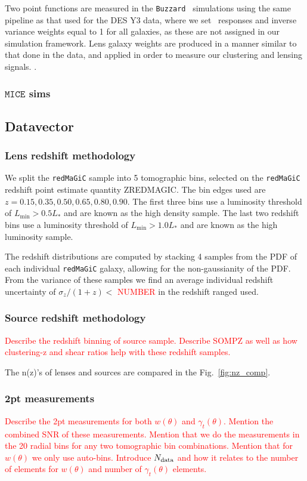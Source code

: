 \documentclass[fleqn,usenatbib]{mnras}
\newcommand{\gammat}{\ensuremath{\gamma_{t}(\theta)}}
\newcommand{\wtheta}{\ensuremath{w(\theta)}}
\newcommand{\redmagic}{\texttt{redMaGiC} }
\newcommand{\mice}{\texttt{MICE} }
\newcommand{\buzzard}{\texttt{Buzzard} }
\newcommand{\red}[1]{\textcolor{red}{#1}}
\begin{document}
Two point functions are measured in the \buzzard\ simulations using the same pipeline as that used for the DES Y3 data, where we set \metacal\ responses and inverse variance weights equal to 1 for all galaxies, as these are not assigned in our simulation framework. Lens galaxy weights are produced in a manner similar to that done in the data, and applied in order to measure our clustering and lensing signals. .

\subsubsection{$\mice$ sims}

\subsection{Datavector}

\subsubsection{Lens redshift methodology}
We split the \redmagic sample into 5 tomographic bins, selected on the \redmagic redshift point estimate quantity ZREDMAGIC. The bin edges used are $z=0.15, 0.35, 0.50, 0.65, 0.80, 0.90$. The first three bins use a luminosity threshold of $L_{\min} > 0.5 L_{*}$ and are known as the high density sample. The last two redshift bins use a luminosity threshold of $L_{\min} > 1.0 L_{*}$ and are known as the high luminosity sample.

The redshift distributions are computed by stacking 4 samples from the PDF of each individual \redmagic galaxy, allowing for the non-gaussianity of the PDF. From the variance of these samples we find an average individual redshift uncertainty of $\sigma_z/(1+z) < $ \red{NUMBER} in the redshift ranged used.

\subsubsection{Source redshift methodology}
\red{Describe the redshift binning of source sample. Describe SOMPZ as well as how clustering-z and shear ratios help with these redshift samples.}

The n(z)'s of lenses and sources are compared in the Fig.~\ref{fig:nz_comp}.


\subsubsection{2pt measurements}
\red{Describe the 2pt measurements for both $\wtheta$ and $\gammat$. Mention the combined SNR of these measurements. Mention that we do the measurements in the 20 radial bins for any two tomographic bin combinations. Mention that for $\wtheta$ we only use auto-bins. Introduce $N_{\rm data}$ and how it relates to the number of elements for $\wtheta$ and number of $\gammat$ elements.} 
\end{document}
